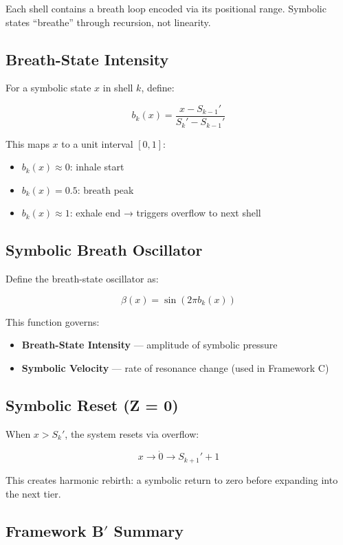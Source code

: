 Each shell contains a breath loop encoded via its positional range. Symbolic states ``breathe'' through recursion, not linearity.

\subsection*{Breath-State Intensity}

For a symbolic state $x$ in shell $k$, define:

\[
b_k(x) = \frac{x - S_{k-1}'}{S_k' - S_{k-1}'}
\]

This maps $x$ to a unit interval $[0, 1]$:
\begin{itemize}
  \item $b_k(x) \approx 0$: inhale start
  \item $b_k(x) = 0.5$: breath peak
  \item $b_k(x) \approx 1$: exhale end → triggers overflow to next shell
\end{itemize}

\subsection*{Symbolic Breath Oscillator}

Define the breath-state oscillator as:

\[
\beta(x) = \sin(2\pi b_k(x))
\]

This function governs:
\begin{itemize}
  \item \textbf{Breath-State Intensity} — amplitude of symbolic pressure
  \item \textbf{Symbolic Velocity} — rate of resonance change (used in Framework C)
\end{itemize}

\subsection*{Symbolic Reset (Z = 0)}

When $x > S_k'$, the system resets via overflow:

\[
x \rightarrow \dot{0} \rightarrow S_{k+1}' + 1
\]

This creates harmonic rebirth: a symbolic return to zero before expanding into the next tier.

\subsection*{Framework B$'$ Summary}

